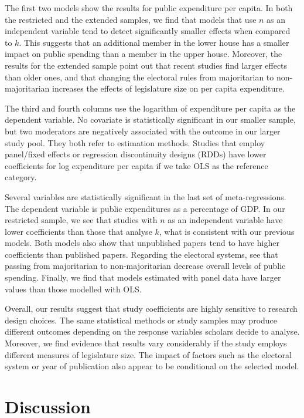 \documentclass[a4paper,12pt]{article}
\begin{document}

The first two models show the results for public expenditure per capita. In both
the restricted and the extended samples, we find that models that use $n$ as an
independent variable tend to detect significantly smaller effects when compared
to $k$. This suggests that an additional member in the lower house has a smaller
impact on public spending than a member in the upper house. Moreover, the
results for the extended sample point out that recent studies find larger
effects than older ones, and that changing the electoral rules from majoritarian
to non-majoritarian increases the effects of legislature size on per capita
expenditure.

The third and fourth columns use the logarithm of expenditure per capita as the
dependent variable. No covariate is statistically significant in our smaller
sample, but two moderators are negatively associated with the outcome in our
larger study pool. They both refer to estimation methods. Studies that employ
panel/fixed effects or regression discontinuity designs (RDDs) have lower
coefficients for log expenditure per capita if we take OLS as the reference
category.

Several variables are statistically significant in the last set of
meta-regressions. The dependent variable is public expenditures as a percentage
of GDP. In our restricted sample, we see that studies with $n$ as an
independent variable have lower coefficients than those that analyse $k$, what
is consistent with our previous models. Both models also show that unpublished
papers tend to have higher coefficients than published papers. Regarding the
electoral systems, see that passing from majoritarian to non-majoritarian
decrease overall levels of public spending. Finally, we find that models
estimated with panel data have larger values than those modelled with OLS.

Overall, our results suggest that study coefficients are highly sensitive to
research design choices. The same statistical methods or study samples may
produce different outcomes depending on the response variables scholars decide
to analyse. Moreover, we find evidence that results vary considerably if the
study employs different measures of legislature size. The impact of factors such
as the electoral system or year of publication also appear to be conditional on
the selected model.

\section{Discussion}
\label{sec:discussion}
\end{document}
